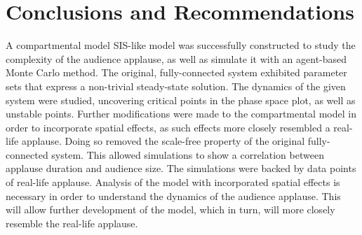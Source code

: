 \chapter{Conclusions and Recommendations}
\label{conclusions}

\hspace{\parindent} A compartmental model SIS-like model was successfully constructed to study the complexity of the audience applause, as well as simulate it with an agent-based Monte Carlo method. 
The original, fully-connected system exhibited parameter sets that express a  non-trivial steady-state solution. The dynamics of the given system were studied, uncovering critical points in the phase space plot, as well as unstable points.
Further modifications were made to the compartmental model in order to incorporate spatial effects, as such effects more closely resembled a real-life applause.
Doing so removed the scale-free property of the original fully-connected system.
This allowed simulations to show a correlation between applause duration and audience size.
The simulations were backed by data points of real-life applause.
Analysis of the model with incorporated spatial effects is necessary in order to understand the dynamics of the audience applause.
This will allow further development of the model, which in turn, will more closely resemble the real-life applause.

